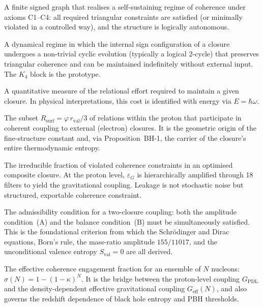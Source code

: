 \documentclass[11pt,a4paper]{article}
\theoremstyle{plain}
\theoremstyle{definition}
\theoremstyle{remark}
\newcommand{\Kfour}{K_4}
\newcommand{\Geff}{G_{\mathrm{eff}}}
\newcommand{\GPDL}{G_{\mathrm{PDL}}}
\newcommand{\epsG}{\varepsilon_G}
\newcommand{\rval}{r_{\mathrm{val}}}
\newcommand{\Rsurf}{R_{\mathrm{surf}}}
\begin{document}
\begin{description}[style=nextline, leftmargin=2.5cm]

\item[Closure]
A finite signed graph that realises a self-sustaining regime of coherence under axioms C1--C4: all required triangular constraints are satisfied (or minimally violated in a controlled way), and the structure is logically autonomous.

\item[Logical stationary regime]
A dynamical regime in which the internal sign configuration of a closure undergoes a non-trivial cyclic evolution (typically a logical 2-cycle) that preserves triangular coherence and can be maintained indefinitely without external input.
The $\Kfour$ block is the prototype.

\item[Coherence cost]
A quantitative measure of the relational effort required to maintain a given closure.
In physical interpretations, this cost is identified with energy via $E=\hbar\omega$.

\item[Active surface]
The subset $\Rsurf = \varphi\,\rval/3$ of relations within the proton that participate in coherent coupling to external (electron) closures.
It is the geometric origin of the fine-structure constant and, via Proposition~BH-1, the carrier of the closure's entire thermodynamic entropy.

\item[Leakage ($\varepsilon$)]
The irreducible fraction of violated coherence constraints in an optimised composite closure.
At the proton level, $\epsG$ is hierarchically amplified through 18 filters to yield the gravitational coupling.
Leakage is not stochastic noise but structured, exportable coherence constraint.

\item[$(A)\wedge(B)$ coupling criterion]
The admissibility condition for a two-closure coupling: both the amplitude condition~(A) and the balance condition~(B) must be simultaneously satisfied.
This is the foundational criterion from which the Schr\"odinger and Dirac equations, Born's rule, the mass-ratio amplitude $155/11017$, and the unconditional valence entropy $S_{\mathrm{val}}=0$ are all derived.

\item[$\sigma(N)$]
The effective coherence engagement fraction for an ensemble of $N$ nucleons: $\sigma(N)=1-(1-\kappa)^N$.
It is the bridge between the proton-level coupling $\GPDL$ and the density-dependent effective gravitational coupling $\Geff(N)$, and also governs the redshift dependence of black hole entropy and PBH thresholds.


\end{description}
\end{document}
